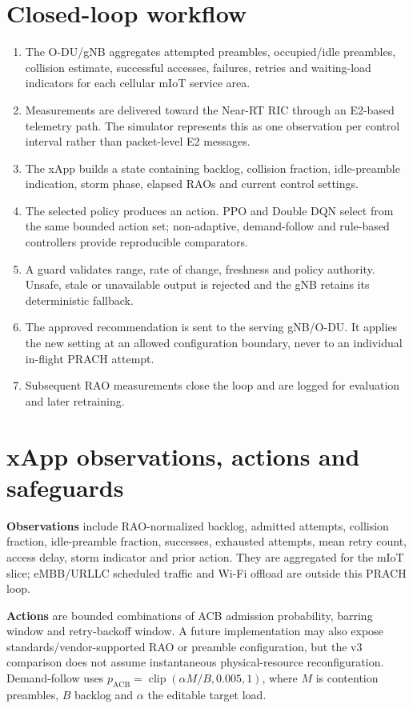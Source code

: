 \documentclass[10pt]{article}
\begin{document}
\section{Closed-loop workflow}
\begin{enumerate}
\item The O-DU/gNB aggregates attempted preambles, occupied/idle preambles, collision estimate, successful accesses, failures, retries and waiting-load indicators for each cellular mIoT service area.
\item Measurements are delivered toward the Near-RT RIC through an E2-based telemetry path. The simulator represents this as one observation per control interval rather than packet-level E2 messages.
\item The xApp builds a state containing backlog, collision fraction, idle-preamble indication, storm phase, elapsed RAOs and current control settings.
\item The selected policy produces an action. PPO and Double DQN select from the same bounded action set; non-adaptive, demand-follow and rule-based controllers provide reproducible comparators.
\item A guard validates range, rate of change, freshness and policy authority. Unsafe, stale or unavailable output is rejected and the gNB retains its deterministic fallback.
\item The approved recommendation is sent to the serving gNB/O-DU. It applies the new setting at an allowed configuration boundary, never to an individual in-flight PRACH attempt.
\item Subsequent RAO measurements close the loop and are logged for evaluation and later retraining.
\end{enumerate}

\section{xApp observations, actions and safeguards}
\textbf{Observations} include RAO-normalized backlog, admitted attempts, collision fraction, idle-preamble fraction, successes, exhausted attempts, mean retry count, access delay, storm indicator and prior action. They are aggregated for the mIoT slice; eMBB/URLLC scheduled traffic and Wi-Fi offload are outside this PRACH loop.

\textbf{Actions} are bounded combinations of ACB admission probability, barring window and retry-backoff window. A future implementation may also expose standards/vendor-supported RAO or preamble configuration, but the v3 comparison does not assume instantaneous physical-resource reconfiguration. Demand-follow uses $p_{\mathrm{ACB}}=\operatorname{clip}(\alpha M/B,0.005,1)$, where $M$ is contention preambles, $B$ backlog and $\alpha$ the editable target load.
\end{document}
